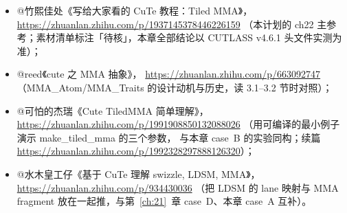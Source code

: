 \begin{itemize}
  \item @竹熙佳处《写给大家看的 CuTe 教程：Tiled MMA》，
        \url{https://zhuanlan.zhihu.com/p/1937145378446226159}
        （本计划的 ch22 主参考；素材清单标注「待核」，本章全部结论以
        CUTLASS v4.6.1 头文件实测为准）；
  \item @reed《cute 之 MMA 抽象》，
        \url{https://zhuanlan.zhihu.com/p/663092747}
        （MMA\_Atom/MMA\_Traits 的设计动机与历史，读 3.1--3.2 节时对照）；
  \item @可怕的杰瑞《Cute TiledMMA 简单理解》，
        \url{https://zhuanlan.zhihu.com/p/1991908850132088026}
        （用可编译的最小例子演示 make\_tiled\_mma 的三个参数，
        与本章 case~B 的实验同构；续篇
        \url{https://zhuanlan.zhihu.com/p/1992328297888126320}）；
  \item @水木皇工仔《基于 CuTe 理解 swizzle, LDSM, MMA》，
        \url{https://zhuanlan.zhihu.com/p/934430036}
        （把 LDSM 的 lane 映射与 MMA fragment 放在一起推，与第~\ref{ch:21}~章
        case~D、本章 case~A 互补）。
\end{itemize}
